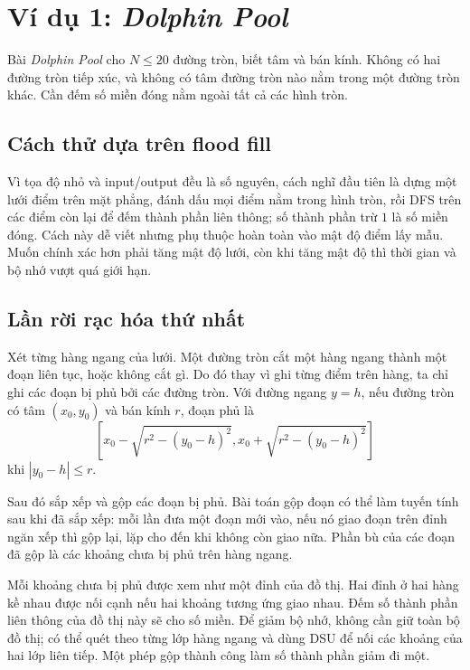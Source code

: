 \documentclass[11pt]{article}
\begin{document}
\section{Ví dụ 1: \textit{Dolphin Pool}}

Bài \textit{Dolphin Pool} cho \(N\le 20\) đường tròn, biết tâm và bán kính.
Không có hai đường tròn tiếp xúc, và không có tâm đường tròn nào nằm trong một
đường tròn khác. Cần đếm số miền đóng nằm ngoài tất cả các hình tròn.

\subsection{Cách thử dựa trên flood fill}

Vì tọa độ nhỏ và input/output đều là số nguyên, cách nghĩ đầu tiên là dựng một
lưới điểm trên mặt phẳng, đánh dấu mọi điểm nằm trong hình tròn, rồi DFS trên
các điểm còn lại để đếm thành phần liên thông; số thành phần trừ \(1\) là số
miền đóng. Cách này dễ viết nhưng phụ thuộc hoàn toàn vào mật độ điểm lấy mẫu.
Muốn chính xác hơn phải tăng mật độ lưới, còn khi tăng mật độ thì thời gian và
bộ nhớ vượt quá giới hạn.

\subsection{Lần rời rạc hóa thứ nhất}

Xét từng hàng ngang của lưới. Một đường tròn cắt một hàng ngang thành một đoạn
liên tục, hoặc không cắt gì. Do đó thay vì ghi từng điểm trên hàng, ta chỉ ghi
các đoạn bị phủ bởi các đường tròn. Với đường ngang \(y=h\), nếu đường tròn có
tâm \((x_0,y_0)\) và bán kính \(r\), đoạn phủ là
\[
  \left[
    x_0-\sqrt{r^2-(y_0-h)^2},
    x_0+\sqrt{r^2-(y_0-h)^2}
  \right]
\]
khi \(|y_0-h|\le r\).

Sau đó sắp xếp và gộp các đoạn bị phủ. Bài toán gộp đoạn có thể làm tuyến tính
sau khi đã sắp xếp: mỗi lần đưa một đoạn mới vào, nếu nó giao đoạn trên đỉnh
ngăn xếp thì gộp lại, lặp cho đến khi không còn giao nữa. Phần bù của các đoạn
đã gộp là các khoảng chưa bị phủ trên hàng ngang.

Mỗi khoảng chưa bị phủ được xem như một đỉnh của đồ thị. Hai đỉnh ở hai hàng
kề nhau được nối cạnh nếu hai khoảng tương ứng giao nhau. Đếm số thành phần
liên thông của đồ thị này sẽ cho số miền. Để giảm bộ nhớ, không cần giữ toàn
bộ đồ thị; có thể quét theo từng lớp hàng ngang và dùng DSU để nối các khoảng
của hai lớp liên tiếp. Một phép gộp thành công làm số thành phần giảm đi một.
\end{document}
